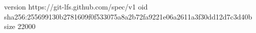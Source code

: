 version https://git-lfs.github.com/spec/v1
oid sha256:255699130b2781609f0f533075a8a2b72fa9221e06a2611a3f30dd12d7c3d40b
size 22000
